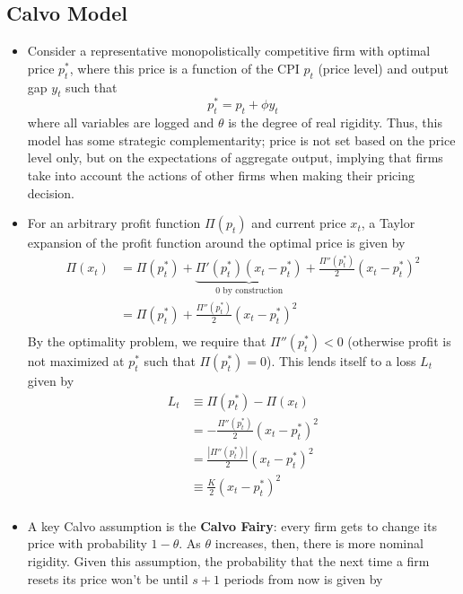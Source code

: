 \documentclass[12pt]{article}
\begin{document}
\begin{itemize}
\begin{itemize}
\begin{quote}
        \end{quote}
    \end{itemize}
\end{itemize}

\subsection{Calvo Model}

\begin{itemize}
    \item Consider a representative monopolistically competitive firm with optimal price $p_t^*$, where this price is a function of the CPI $p_t$ (price level) and output gap $y_t$ such that
    \[p_t^* = p_t + \phi y_t\]
    where all variables are logged and $\theta$ is the degree of real rigidity. Thus, this model has some strategic complementarity; price is not set based on the price level only, but on the expectations of aggregate output, implying that firms take into account the actions of other firms when making their pricing decision. 
    \item For an arbitrary profit function $\Pi(p_t)$ and current price $x_t$, a Taylor expansion of the profit function around the optimal price is given by
    \[\begin{split}
        \Pi(x_t) &= \Pi(p_t^*) + \underbrace{\Pi'(p_t^*)(x_t - p_t^*)}_{\text{0 by construction}} + \frac{\Pi''(p_t^*)}{2}(x_t - p_t^*)^2 \\
        &= \Pi(p_t^*) + \frac{\Pi''(p_t^*)}{2}(x_t - p_t^*)^2 \\
    \end{split}\]
    By the optimality problem, we require that $\Pi''(p_t^*) < 0$ (otherwise profit is not maximized at $p_t^*$ such that $\Pi(p_t^*) = 0$). This lends itself to a loss $L_t$ given by
    \[\begin{split}
        L_t &\equiv \Pi(p_t^*) - \Pi(x_t) \\
        &= -\frac{\Pi''(p_t^*)}{2}(x_t - p_t^*)^2 \\
        &= \frac{|\Pi''(p_t^*)|}{2}(x_t - p_t^*)^2 \\
        &\equiv \frac{K}{2}(x_t - p_t^*)^2 \\
    \end{split}\]
    \item A key Calvo assumption is the \textbf{Calvo Fairy}: every firm gets to change its price with probability $1-\theta$. As $\theta$ increases, then, there is more nominal rigidity. Given this assumption, the probability that the next time a firm resets its price won't be until $s+1$ periods from now is given by 

\end{itemize}
\end{document}
